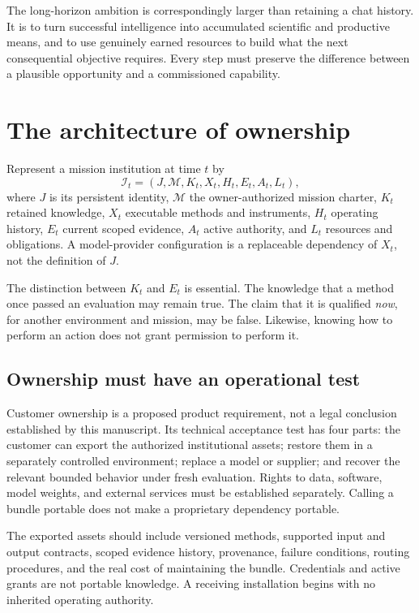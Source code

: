The long-horizon ambition is correspondingly larger than retaining a chat history. It is to turn successful intelligence into accumulated scientific and productive means, and to use genuinely earned resources to build what the next consequential objective requires. Every step must preserve the difference between a plausible opportunity and a commissioned capability.

\section{The architecture of ownership}
\label{sec:ownership}
Represent a mission institution at time $t$ by
\begin{equation}
\mathcal I_t=(J,\mathcal M, K_t,X_t,H_t,E_t,A_t,L_t),
\end{equation}
where $J$ is its persistent identity, $\mathcal M$ the owner-authorized mission charter, $K_t$ retained knowledge, $X_t$ executable methods and instruments, $H_t$ operating history, $E_t$ current scoped evidence, $A_t$ active authority, and $L_t$ resources and obligations. A model-provider configuration is a replaceable dependency of $X_t$, not the definition of $J$.

The distinction between $K_t$ and $E_t$ is essential. The knowledge that a method once passed an evaluation may remain true. The claim that it is qualified \emph{now}, for another environment and mission, may be false. Likewise, knowing how to perform an action does not grant permission to perform it.

\subsection{Ownership must have an operational test}
Customer ownership is a proposed product requirement, not a legal conclusion established by this manuscript. Its technical acceptance test has four parts: the customer can export the authorized institutional assets; restore them in a separately controlled environment; replace a model or supplier; and recover the relevant bounded behavior under fresh evaluation. Rights to data, software, model weights, and external services must be established separately. Calling a bundle portable does not make a proprietary dependency portable.

The exported assets should include versioned methods, supported input and output contracts, scoped evidence history, provenance, failure conditions, routing procedures, and the real cost of maintaining the bundle. Credentials and active grants are not portable knowledge. A receiving installation begins with no inherited operating authority.

